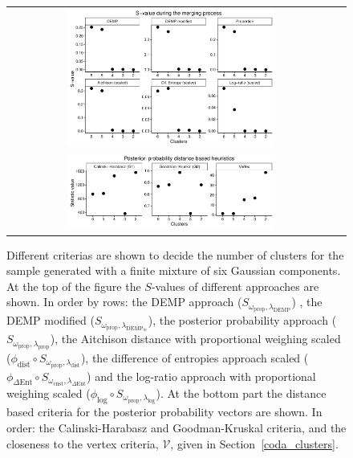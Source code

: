 \documentclass[submit]{smj}
\theoremstyle{definition}
\begin{document}
\begin{figure}[!t]
\begin{center}
\begin{tabular}{cc}
  \includegraphics[width=0.65\textwidth]{figures/gaussian_Svalues.pdf} \\
   \includegraphics[width=0.65\textwidth]{figures/gaussian_statistics.pdf}
 \end{tabular}
\caption{Different criterias are shown to decide the number of clusters for the sample generated with a finite mixture of six Gaussian components. At the top of the figure the $S$-values of different approaches are shown. In order by rows: the DEMP approach \citep{hennig2010methods} ($S_{\omega_{\text{prop}}, \lambda_{\text{DEMP}}}$) , the DEMP modified \citep{longford2014} ($S_{\omega_{\text{prop}}, \lambda_{\text{DEMP}_m}}$), the posterior probability approach ($S_{\omega_{\text{prop}}, \lambda_{\text{prop}}}$), the Aitchison distance with proportional weighing scaled ($\phi_{\text{dist}} \circ S_{\omega_\text{prop}, \lambda_{\text{dist}}}$), the difference of entropies approach scaled ($\phi_{\Delta\text{Ent}} \circ S_{\omega_{\text{cnst}}, \lambda_{\Delta\text{Ent}}}$) and the log-ratio approach with proportional weighing scaled ($\phi_{\log} \circ S_{\omega_{\text{prop}}, \lambda_{\log}}$). At the bottom part the distance based criteria for the posterior probability vectors are shown. In order: the Calinski-Harabasz and Goodman-Kruskal criteria, and the closeness to the vertex criteria, $\mathcal{V}$, given in Section~\ref{coda_clusters}.}\label{gaussian_Svalues}
\end{center}
\end{figure}
\end{document}
